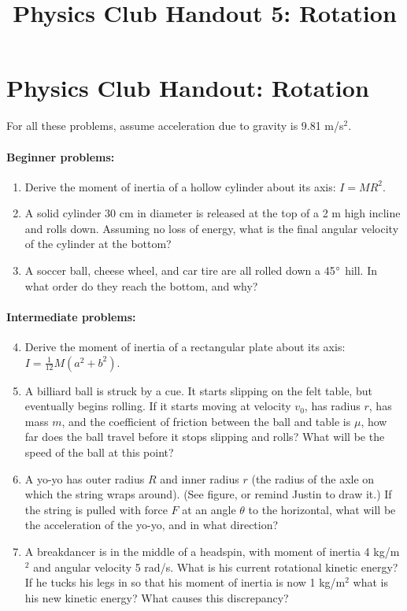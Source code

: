 \documentclass[12pt,letterpaper]{article}
\title{Physics Club Handout 5: Rotation}
\begin{document}
\section{Physics Club Handout: Rotation}
For all these problems, assume acceleration due to gravity is 9.81 m\slash s$^2$.
\\

\paragraph{Beginner problems:}
\begin{enumerate}
\item
Derive the moment of inertia of a hollow cylinder about its axis: $I = MR^2$.

\item
A solid cylinder 30 cm in diameter is released at the top of a 2 m high incline and rolls down. Assuming no loss of energy, what is the final angular velocity of the cylinder at the bottom?

\item
A soccer ball, cheese wheel, and car tire are all rolled down a 45$\degree$ hill. In what order do they reach the bottom, and why?
\end{enumerate}
\paragraph{Intermediate problems:}
\begin{enumerate}
\setcounter{enumi}{3}
\item
Derive the moment of inertia of a rectangular plate about its axis: $I = \frac{1}{12}M(a^2+b^2)$.

\item
A billiard ball is struck by a cue. It starts slipping on the felt table, but eventually begins rolling. If it starts moving at velocity $v_0$, has radius $r$, has mass $m$, and the coefficient of friction between the ball and table is $\mu$, how far does the ball travel before it stops slipping and rolls? What will be the speed of the ball at this point?

\item
A yo-yo has outer radius $R$ and inner radius $r$ (the radius of the axle on which the string wraps around). (See figure, or remind Justin to draw it.) If the string is pulled with force $F$ at an angle $\theta$ to the horizontal, what will be the acceleration of the yo-yo, and in what direction?

\item
A breakdancer is in the middle of a headspin, with moment of inertia 4 kg/m$^2$ and angular velocity 5 rad/s. What is his current rotational kinetic energy? If he tucks his legs in so that his moment of inertia is now 1 kg/m$^2$ what is his new kinetic energy? What causes this discrepancy?
\end{enumerate}
\end{document}
